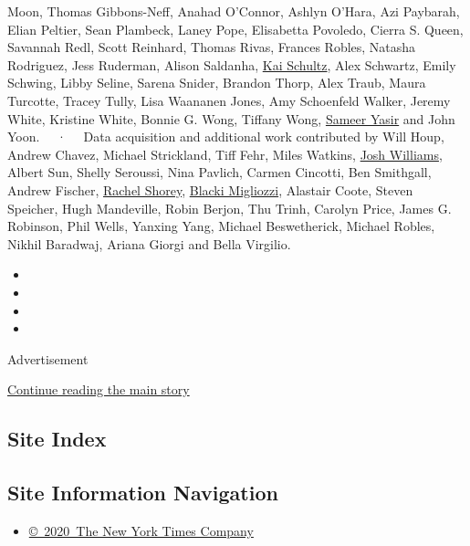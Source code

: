 Moon, Thomas Gibbons-Neff, Anahad O'Connor, Ashlyn O'Hara, Azi Paybarah,
Elian Peltier, Sean Plambeck, Laney Pope, Elisabetta Povoledo, Cierra S.
Queen, Savannah Redl, Scott Reinhard, Thomas Rivas, Frances Robles,
Natasha Rodriguez, Jess Ruderman, Alison Saldanha,
\href{https://www.nytimes3xbfgragh.onion/by/kai-schultz}{Kai Schultz},
Alex Schwartz, Emily Schwing, Libby Seline, Sarena Snider, Brandon
Thorp, Alex Traub, Maura Turcotte, Tracey Tully, Lisa Waananen Jones,
Amy Schoenfeld Walker, Jeremy White, Kristine White, Bonnie G. Wong,
Tiffany Wong,
\href{https://www.nytimes3xbfgragh.onion/by/sameer-yasir}{Sameer Yasir}
and John Yoon. ~~·~~ Data acquisition and additional work contributed by
Will Houp, Andrew Chavez, Michael Strickland, Tiff Fehr, Miles Watkins,
\href{https://www.nytimes3xbfgragh.onion/by/josh-williams}{Josh
Williams}, Albert Sun, Shelly Seroussi, Nina Pavlich, Carmen Cincotti,
Ben Smithgall, Andrew Fischer,
\href{https://www.nytimes3xbfgragh.onion/by/rachel-shorey}{Rachel
Shorey},
\href{https://www.nytimes3xbfgragh.onion/by/blacki-migliozzi}{Blacki
Migliozzi}, Alastair Coote, Steven Speicher, Hugh Mandeville, Robin
Berjon, Thu Trinh, Carolyn Price, James G. Robinson, Phil Wells, Yanxing
Yang, Michael Beswetherick, Michael Robles, Nikhil Baradwaj, Ariana
Giorgi and Bella Virgilio.

\begin{itemize}
\item
\item
\item
\item
\end{itemize}

Advertisement

\protect\hyperlink{after-bottom}{Continue reading the main story}

\hypertarget{site-index}{%
\subsection{Site Index}\label{site-index}}

\hypertarget{site-information-navigation}{%
\subsection{Site Information
Navigation}\label{site-information-navigation}}

\begin{itemize}
\tightlist
\item
  \href{https://help.nytimes3xbfgragh.onion/hc/en-us/articles/115014792127-Copyright-notice}{©~2020~The
  New York Times Company}
\end{itemize}

